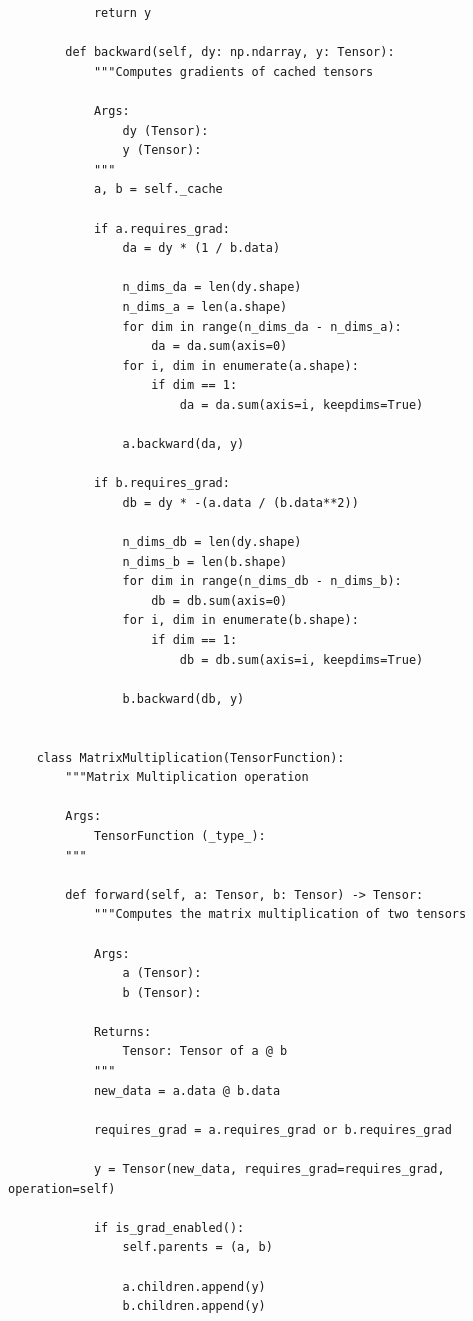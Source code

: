 \documentclass{article}
\begin{document}
\begin{verbatim}
            return y

        def backward(self, dy: np.ndarray, y: Tensor):
            """Computes gradients of cached tensors

            Args:
                dy (Tensor):
                y (Tensor):
            """
            a, b = self._cache

            if a.requires_grad:
                da = dy * (1 / b.data)

                n_dims_da = len(dy.shape)
                n_dims_a = len(a.shape)
                for dim in range(n_dims_da - n_dims_a):
                    da = da.sum(axis=0)
                for i, dim in enumerate(a.shape):
                    if dim == 1:
                        da = da.sum(axis=i, keepdims=True)

                a.backward(da, y)

            if b.requires_grad:
                db = dy * -(a.data / (b.data**2))

                n_dims_db = len(dy.shape)
                n_dims_b = len(b.shape)
                for dim in range(n_dims_db - n_dims_b):
                    db = db.sum(axis=0)
                for i, dim in enumerate(b.shape):
                    if dim == 1:
                        db = db.sum(axis=i, keepdims=True)

                b.backward(db, y)


    class MatrixMultiplication(TensorFunction):
        """Matrix Multiplication operation

        Args:
            TensorFunction (_type_):
        """

        def forward(self, a: Tensor, b: Tensor) -> Tensor:
            """Computes the matrix multiplication of two tensors

            Args:
                a (Tensor):
                b (Tensor):

            Returns:
                Tensor: Tensor of a @ b
            """
            new_data = a.data @ b.data

            requires_grad = a.requires_grad or b.requires_grad

            y = Tensor(new_data, requires_grad=requires_grad, operation=self)

            if is_grad_enabled():
                self.parents = (a, b)

                a.children.append(y)
                b.children.append(y)


\end{verbatim}
\end{document}
